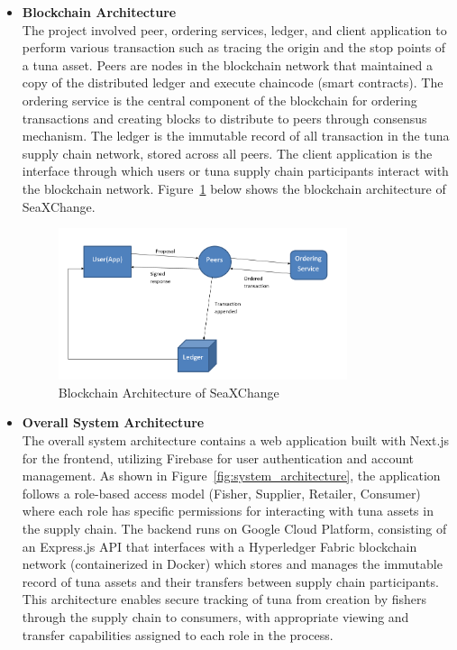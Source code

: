\begin{itemize}
	\item \textbf{Blockchain Architecture}
	\\The project involved peer, ordering services, ledger, and client application to perform various transaction such as tracing the origin and the stop points of a tuna asset. Peers are nodes in the blockchain network that maintained a copy of the distributed ledger and execute chaincode (smart contracts). The ordering service is the central component of the blockchain for ordering transactions and creating blocks to distribute to peers through consensus mechanism. The ledger is the immutable record of all transaction in the tuna supply chain network, stored across all peers. The client application is the interface through which users or tuna supply chain participants interact with the blockchain network. Figure~\ref{fig:blockchain_model} below shows the blockchain architecture of SeaXChange.
	
	\begin{figure}[H]
		\centering
		\includegraphics[width=0.8\textwidth]{SeaXChange_model.png}
		\caption{Blockchain Architecture of SeaXChange}
		\label{fig:blockchain_model}
	\end{figure}
	
	\item \textbf{Overall System Architecture}
	\\The overall system architecture contains a web application built with Next.js for the frontend, utilizing Firebase for user authentication and account management. As shown in Figure~\ref{fig:system_architecture}, the application follows a role-based access model (Fisher, Supplier, Retailer, Consumer) where each role has specific permissions for interacting with tuna assets in the supply chain. The backend runs on Google Cloud Platform, consisting of an Express.js API that interfaces with a Hyperledger Fabric blockchain network (containerized in Docker) which stores and manages the immutable record of tuna assets and their transfers between supply chain participants. This architecture enables secure tracking of tuna from creation by fishers through the supply chain to consumers, with appropriate viewing and transfer capabilities assigned to each role in the process.
	

\end{itemize}
